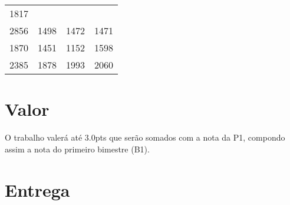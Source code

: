 \documentclass[a4paper]{article}
\begin{document}
\begin{longtable}[c]{@{}cccc@{}}
\begin{minipage}[t]{0.06\columnwidth}
1817
\strut\end{minipage}\tabularnewline
\begin{minipage}[t]{0.06\columnwidth}\centering\strut
2856
\strut\end{minipage} &
\begin{minipage}[t]{0.06\columnwidth}\centering\strut
1498
\strut\end{minipage} &
\begin{minipage}[t]{0.06\columnwidth}\centering\strut
1472
\strut\end{minipage} &
\begin{minipage}[t]{0.06\columnwidth}\centering\strut
1471
\strut\end{minipage}\tabularnewline
\begin{minipage}[t]{0.06\columnwidth}\centering\strut
1870
\strut\end{minipage} &
\begin{minipage}[t]{0.06\columnwidth}\centering\strut
1451
\strut\end{minipage} &
\begin{minipage}[t]{0.06\columnwidth}\centering\strut
1152
\strut\end{minipage} &
\begin{minipage}[t]{0.06\columnwidth}\centering\strut
1598
\strut\end{minipage}\tabularnewline
\begin{minipage}[t]{0.06\columnwidth}\centering\strut
2385
\strut\end{minipage} &
\begin{minipage}[t]{0.06\columnwidth}\centering\strut
1878
\strut\end{minipage} &
\begin{minipage}[t]{0.06\columnwidth}\centering\strut
1993
\strut\end{minipage} &
\begin{minipage}[t]{0.06\columnwidth}\centering\strut
2060
\strut\end{minipage}\tabularnewline
\bottomrule
\end{longtable}

\section{Valor}
O trabalho valerá até $3.0$pts que serão somados com a nota da P1, compondo assim a nota do primeiro bimestre (B1).

\section{Entrega}
\end{document}
